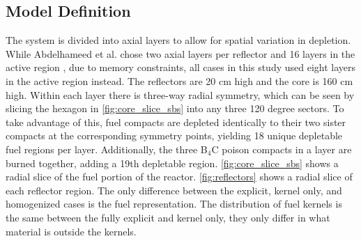 \documentclass[letterpaper]{physor2024}
\begin{document}
\subsection{Model Definition}\label{sec:model_def}
The system is divided into axial layers to allow for spatial variation in depletion. While Abdelhameed et al. chose two axial layers per reflector and 16 layers in the active region \cite{Abdelhameed-ANS-2022}, due to memory constraints, all cases in this study used eight layers in the active region instead. The reflectors are 20 cm high and the core is 160 cm high. Within each layer there is three-way radial symmetry, which can be seen by slicing the hexagon in \cref{fig:core_slice_sbs} into any three 120 degree sectors. To take advantage of this, fuel compacts are depleted identically to their two sister compacts at the corresponding symmetry points, yielding 18 unique depletable fuel regions per layer. Additionally, the three B$_{4}$C poison compacts in a layer are burned together, adding a 19th depletable region. \cref{fig:core_slice_sbs} shows a radial slice of the fuel portion of the reactor. \cref{fig:reflectors} shows a radial slice of each reflector region. The only difference between the explicit, kernel only, and homogenized cases is the fuel representation. The distribution of fuel kernels is the same between the fully explicit and kernel only, they only differ in what material is outside the kernels.
\end{document}
